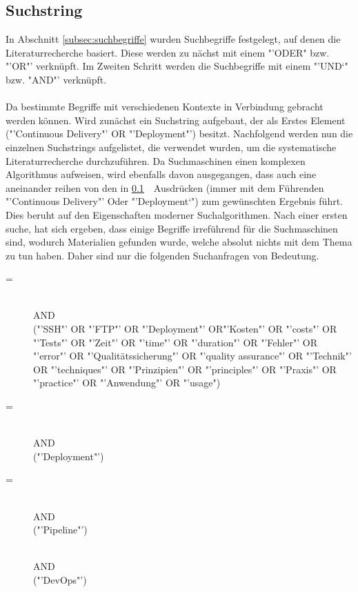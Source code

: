 \subsection{Suchstring}
\label{subsec:suchstring}
In Abschnitt \ref{subsec:suchbegriffe}  wurden Suchbegriffe festgelegt, auf denen die Literaturrecherche basiert. Diese werden zu nächst mit einem "'ODER" bzw. "'OR"' verknüpft. Im Zweiten Schritt werden die Suchbegriffe mit einem "'UND`" bzw. "AND"' verknüpft.
\\\\
Da bestimmte Begriffe mit verschiedenen Kontexte in Verbindung gebracht werden können. Wird zunächst ein Suchstring aufgebaut, der als Erstes Element ("'Continuous Delivery"' OR "'Deployment"') besitzt. Nachfolgend werden nun die einzelnen Suchstrings aufgelistet, die verwendet wurden, um die systematische Literaturrecherche durchzuführen. Da Suchmaschinen einen komplexen Algorithmus aufweisen, wird ebenfalls davon ausgegangen, dass auch eine aneinander reihen von den in \ref{subsec:suchstring}\ \ Ausdrücken (immer mit dem Führenden "'Continuous Delivery"' Oder "'Deployment`") zum gewünschten Ergebnis führt. Dies beruht auf den Eigenschaften moderner Suchalgorithmen.
Nach einer ersten suche, hat sich ergeben, dass einige Begriffe irreführend für die Suchmaschinen sind, wodurch Materialien gefunden wurde, welche absolut nichts mit dem Thema zu tun haben. Daher sind nur die folgenden Suchanfragen von Bedeutung.

\begin{description}
	\item[ =] \suchstringPrefix \\AND\\ ("'SSH"' OR "'FTP"' OR "'Deployment"' OR"'Kosten"' OR "'costs"' OR "'Tests"' OR "'Zeit"' OR "'time"' OR "'duration"' OR "'Fehler"' OR "'error"' OR "'Qualitätssicherung"' OR "'quality assurance"' OR "'Technik"' OR "'techniques"' OR "'Prinzipien"' OR "'principles"' OR "'Praxis"' OR "'practice"' OR "'Anwendung"' OR "'usage")
    
    \item[ =] \suchstringPrefix \\AND\\ ("'Deployment"')
    
    \item[ =] \suchstringPrefix \\AND\\ ("'Pipeline"')
    
    \item[] \suchstringPrefix \\AND\\ ("'DevOps"')
\end{description}\noindent

